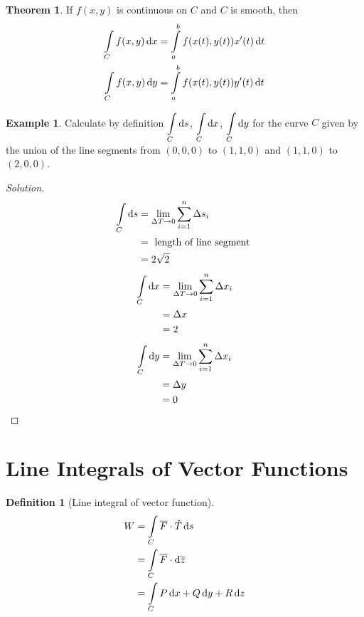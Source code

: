 \documentclass[fleqn, a4paper, 12pt]{article}
\theoremstyle{definition}
\newtheorem{example}{Example}
\newtheorem{definition}{Definition}
\theoremstyle{theorem}
\newtheorem{theorem}{Theorem}
\theoremstyle{remark}
\newenvironment{solution}
{\begin{proof}[Solution]\let\qed\relax}
	{\end{proof}}
\begin{document}
\begin{theorem}
	If $f(x,y)$ is continuous on $C$ and $C$ is smooth, then
	\begin{align*}
		\int\limits_{C} f(x,y) \dif x &= \int\limits_{a}^{b} f(x(t), y(t)) x'(t) \dif t\\
		\int\limits_{C} f(x,y) \dif y &= \int\limits_{a}^{b} f(x(t), y(t)) y'(t) \dif t
	\end{align*}
\end{theorem}

\begin{example}
	Calculate by definition $\displaystyle \int\limits_{C} \dif s$, $\displaystyle \int\limits_{C} \dif x$, $\displaystyle \int\limits_{C} \dif y$ for the curve $C$ given by the union of the line segments from $(0,0,0)$ to $(1,1,0)$ and $(1,1,0)$ to $(2,0,0)$.
\end{example}

\begin{solution}
	\begin{align*}
		\int\limits_{C} \dif s &= \lim\limits_{\Delta T \to 0} \sum_{i = 1}^{n} \Delta s_i\\
		&= \text{ length of line segment }\\
		&= 2 \sqrt{2}
	\end{align*}
	\begin{align*}
		\int\limits_{C} \dif x &= \lim\limits_{\Delta T \to 0} \sum_{i = 1}^{n} \Delta x_i\\
		&= \Delta x\\
		&= 2
	\end{align*}
	\begin{align*}
		\int\limits_{C} \dif y &= \lim\limits_{\Delta T \to 0} \sum_{i = 1}^{n} \Delta x_i\\
		&= \Delta y\\
		&= 0
	\end{align*}
\end{solution}

\section{Line Integrals of Vector Functions}

\begin{definition}[Line integral of vector function]
	\begin{align*}
		W &= \int\limits_{C} \overline{F} \cdot \hat{T} \dif s\\
		&= \int\limits_{C} \overline{F} \cdot \dif \overline{z}\\
		&= \int\limits_{C} P \dif x + Q \dif y + R \dif z
	\end{align*}
\end{definition}	
\end{document}
